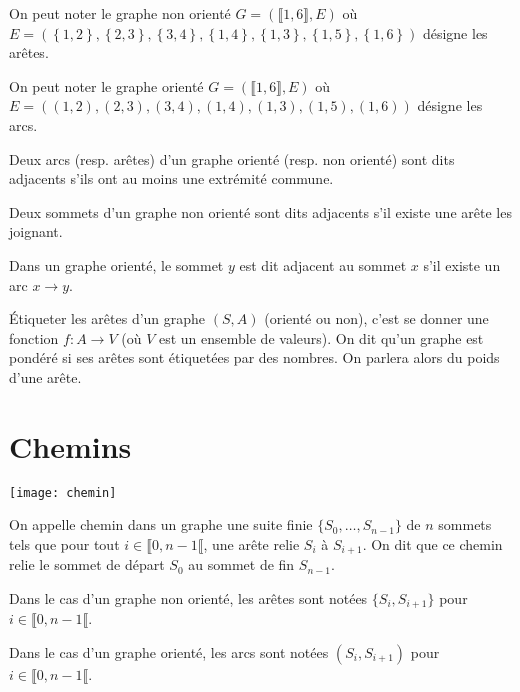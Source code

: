 \begin{rem}
On peut noter le graphe non orienté $G=\left(\llbracket 1,6\rrbracket,E\right)$ où $E=\left(
\left\{1,2\right\},\left\{2,3\right\},\left\{3,4\right\},\left\{1,4\right\},\left\{1,3\right\},\left\{1,5\right\},\left\{1,6\right\}\right)$ désigne les arêtes. 

On peut noter le graphe orienté $G=\left(\llbracket 1,6\rrbracket,E\right)$ où $E=\left(
\left(1,2\right),\left(2,3\right),\left(3,4\right),\left(1,4\right),\left(1,3\right),\left(1,5\right),\left(1,6\right)\right)$ désigne les arcs. 
\end{rem}

\begin{defi}[Adjacence]
Deux arcs (resp. arêtes) d'un graphe orienté (resp. non orienté) sont dits adjacents s'ils ont au moins une extrémité commune. 

Deux sommets d'un graphe non orienté sont dits adjacents s'il existe une arête les joignant. 

Dans un graphe orienté, le sommet $y$ est dit adjacent au sommet $x$ s'il existe un arc $x\to y$.
\end{defi}


\begin{defi}
Étiqueter les arêtes d’un graphe $(S, A)$ (orienté ou non), c’est se donner une fonction
$f : A \to V$ (où $V$ est un ensemble de valeurs). On dit qu’un graphe est pondéré si ses arêtes sont étiquetées par des nombres. On parlera alors du poids d’une arête.
\end{defi}
%
%

\section{Chemins}


\begin{marginfigure}
\texttt{[image: chemin]}
\end{marginfigure}

\begin{defi}

On appelle chemin dans un graphe une suite finie $\{S_0, \ldots , S_{n-1}\}$ de $n$ sommets tels que pour tout
$i \in \llbracket 0, n-1\llbracket$, une arête relie $S_i$ à $S_{i+1}$. On dit que ce chemin relie le sommet de départ $S_0$ au sommet de fin $S_{n-1}$. 

Dans le cas d'un graphe non orienté, les arêtes sont notées $\{S_i, S_{i+1}\}$ pour $i \in \llbracket 0, n-1\llbracket$.

Dans le cas d'un graphe orienté, les arcs sont notées $(S_i, S_{i+1})$ pour $i \in \llbracket 0, n-1\llbracket$.

\end{defi}



